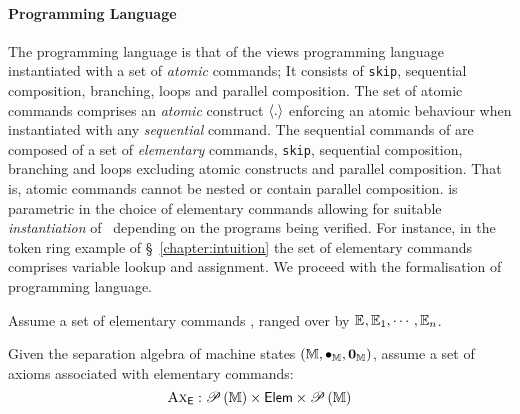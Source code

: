 \paragraph{Programming Language} The \colosl programming language is that of the views programming language~\cite{views} instantiated with a set of \emph{atomic} commands; It consists of \texttt{skip}, sequential composition, branching, loops and parallel composition. The set of \colosl atomic commands comprises an \emph{atomic} construct $\left\langle . \right\rangle$ enforcing an atomic behaviour when instantiated with any \emph{sequential} command. The sequential commands of \colosl are composed of a set of \emph{elementary} commands, \texttt{skip}, sequential composition, branching and loops excluding atomic constructs and parallel composition. That is, atomic commands cannot be nested or contain parallel composition. \colosl is parametric in the choice of elementary commands allowing for suitable \emph{instantiation} of \colosl\ depending on the programs being verified. For instance, in the token ring example of \S~\ref{chapter:intuition} the set of elementary commands comprises variable lookup and assignment. We proceed with the formalisation of \colosl programming language. 
%
\begin{parameter}
Assume a set of elementary commands \Basics, ranged over by $\mathbb{E}_{}, \mathbb{E}_{1}, \cdots, \mathbb{E}_{n}$.
\end{parameter}
%
%
\begin{parameter}
Given the separation algebra of machine states $\left(\mathbb{M}, \bullet_{\mathbb{M}}, \mathbf{0}_{\mathbb{M}} \right)$, assume a set of axioms associated with elementary commands:
%
\[
	\textsc{Ax}_{\textsf{E}} : \mathscr{P}\left(\mathbb{M} \right) \times \textsf{Elem} \times \mathscr{P}\left(\mathbb{M} \right)
\]
%
\end{parameter}
%
%

